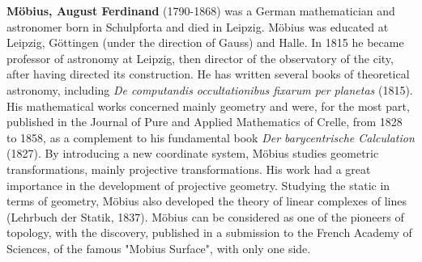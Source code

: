 \textbf{Möbius, August Ferdinand} (1790-1868) was a German mathematician and astronomer born in Schulpforta and died in Leipzig. Möbius was educated at Leipzig, Göttingen (under the direction of Gauss) and Halle. In 1815 he became professor of astronomy at Leipzig, then director of the observatory of the city, after having directed its construction. He has written several books of theoretical astronomy, including \textit{De computandis occultationibus fixarum per planetas} (1815). His mathematical works concerned mainly geometry and were, for the most part, published in the Journal of Pure and Applied Mathematics of Crelle, from 1828 to 1858, as a complement to his fundamental book \textit{Der barycentrische Calculation} (1827). By introducing a new coordinate system, Möbius studies geometric transformations, mainly projective transformations. His work had a great importance in the development of projective geometry. Studying the static in terms of geometry, Möbius also developed the theory of linear complexes of lines (Lehrbuch der Statik, 1837). Möbius can be considered as one of the pioneers of topology, with the discovery, published in a submission to the French Academy of Sciences, of the famous "Mobius Surface", with only one side.

